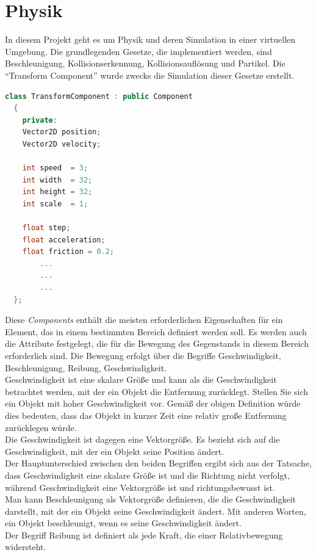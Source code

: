 \documentclass[
  10pt,
  a4paper,
  oneside,
  headers,
  headinclude,
  footinclude,
  BCOR5mm,
]{article}
\begin{document}
\section{Physik}
In diesem Projekt geht es um Physik und deren Simulation in einer virtuellen Umgebung. Die grundlegenden Gesetze, die implementiert werden, sind Beschleunigung, Kollisionserkennung, Kollisionsauflösung und Partikel. Die ``Transform Component'' wurde zwecks die Simulation dieser Gesetze erstellt.

\begin{lstlisting}[language=C++]
  class TransformComponent : public Component
  {
    private:
    Vector2D position;
    Vector2D velocity;

    int speed  = 3;
    int width  = 32;
    int height = 32;
    int scale  = 1;

    float step;
    float acceleration;
    float friction = 0.2;
        ...
        ...
        ...
  };
\end{lstlisting}

Diese \textit{Components} enthält die meisten erforderlichen Eigenschaften für ein Element, das in einem bestimmten Bereich definiert werden soll. Es werden auch die Attribute festgelegt, die für die Bewegung des Gegenstands in diesem Bereich erforderlich sind.
Die Bewegung erfolgt über die Begriffe Geschwindigkeit, Beschleunigung, Reibung, Geschwindigkeit. \\
Geschwindigkeit ist eine skalare Größe und kann als die Geschwindigkeit betrachtet werden, mit der ein Objekt die Entfernung zurücklegt. Stellen Sie sich ein Objekt mit hoher Geschwindigkeit vor. Gemäß der obigen Definition würde dies bedeuten, dass das Objekt in kurzer Zeit eine relativ große Entfernung zurücklegen würde. \\
Die Geschwindigkeit ist dagegen eine Vektorgröße. Es bezieht sich auf die Geschwindigkeit, mit der ein Objekt seine Position ändert.\\
Der Hauptunterschied zwischen den beiden Begriffen ergibt sich aus der Tatsache, dass Geschwindigkeit eine skalare Größe ist und die Richtung nicht verfolgt, während Geschwindigkeit eine Vektorgröße ist und richtungsbewusst ist. \\
Man kann Beschleunigung als Vektorgröße definieren, die die Geschwindigkeit darstellt, mit der ein Objekt seine Geschwindigkeit ändert. Mit anderen Worten, ein Objekt beschleunigt, wenn es seine Geschwindigkeit ändert. \\
Der Begriff Reibung ist definiert als jede Kraft, die einer Relativbewegung widersteht. \\
\end{document}
